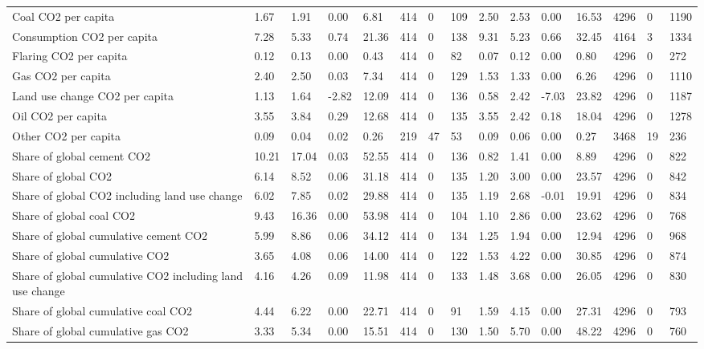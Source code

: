 \begin{longtable}{lllllllllllllll}
Coal CO2 per capita & 1.67 & 1.91 & 0.00 & 6.81 & 414 & 0 & 109 & 2.50 & 2.53 & 0.00 & 16.53 & 4296 & 0 & 1190\\
\addlinespace
Consumption CO2 per capita & 7.28 & 5.33 & 0.74 & 21.36 & 414 & 0 & 138 & 9.31 & 5.23 & 0.66 & 32.45 & 4164 & 3 & 1334\\
Flaring CO2 per capita & 0.12 & 0.13 & 0.00 & 0.43 & 414 & 0 & 82 & 0.07 & 0.12 & 0.00 & 0.80 & 4296 & 0 & 272\\
Gas CO2 per capita & 2.40 & 2.50 & 0.03 & 7.34 & 414 & 0 & 129 & 1.53 & 1.33 & 0.00 & 6.26 & 4296 & 0 & 1110\\
Land use change CO2 per capita & 1.13 & 1.64 & -2.82 & 12.09 & 414 & 0 & 136 & 0.58 & 2.42 & -7.03 & 23.82 & 4296 & 0 & 1187\\
Oil CO2 per capita & 3.55 & 3.84 & 0.29 & 12.68 & 414 & 0 & 135 & 3.55 & 2.42 & 0.18 & 18.04 & 4296 & 0 & 1278\\
\addlinespace
Other CO2 per capita & 0.09 & 0.04 & 0.02 & 0.26 & 219 & 47 & 53 & 0.09 & 0.06 & 0.00 & 0.27 & 3468 & 19 & 236\\
Share of global cement CO2 & 10.21 & 17.04 & 0.03 & 52.55 & 414 & 0 & 136 & 0.82 & 1.41 & 0.00 & 8.89 & 4296 & 0 & 822\\
Share of global CO2 & 6.14 & 8.52 & 0.06 & 31.18 & 414 & 0 & 135 & 1.20 & 3.00 & 0.00 & 23.57 & 4296 & 0 & 842\\
Share of global CO2 including land use change & 6.02 & 7.85 & 0.02 & 29.88 & 414 & 0 & 135 & 1.19 & 2.68 & -0.01 & 19.91 & 4296 & 0 & 834\\
Share of global coal CO2 & 9.43 & 16.36 & 0.00 & 53.98 & 414 & 0 & 104 & 1.10 & 2.86 & 0.00 & 23.62 & 4296 & 0 & 768\\
\addlinespace
Share of global cumulative cement CO2 & 5.99 & 8.86 & 0.06 & 34.12 & 414 & 0 & 134 & 1.25 & 1.94 & 0.00 & 12.94 & 4296 & 0 & 968\\
Share of global cumulative CO2 & 3.65 & 4.08 & 0.06 & 14.00 & 414 & 0 & 122 & 1.53 & 4.22 & 0.00 & 30.85 & 4296 & 0 & 874\\
Share of global cumulative CO2 including land use change & 4.16 & 4.26 & 0.09 & 11.98 & 414 & 0 & 133 & 1.48 & 3.68 & 0.00 & 26.05 & 4296 & 0 & 830\\
Share of global cumulative coal CO2 & 4.44 & 6.22 & 0.00 & 22.71 & 414 & 0 & 91 & 1.59 & 4.15 & 0.00 & 27.31 & 4296 & 0 & 793\\
Share of global cumulative gas CO2 & 3.33 & 5.34 & 0.00 & 15.51 & 414 & 0 & 130 & 1.50 & 5.70 & 0.00 & 48.22 & 4296 & 0 & 760\\

\end{longtable}
